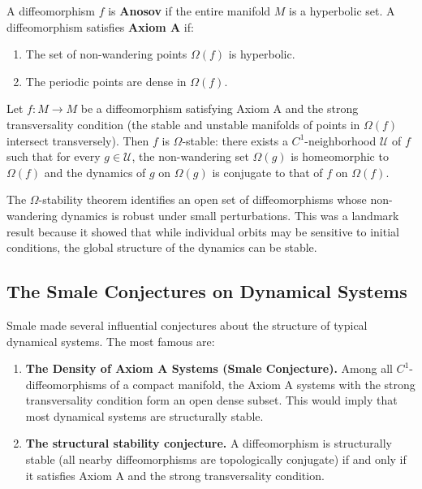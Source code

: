 A diffeomorphism \(f\) is \textbf{Anosov} if the entire manifold \(M\) is a hyperbolic set. A diffeomorphism satisfies \textbf{Axiom A} if:
\begin{enumerate}
    \item The set of non-wandering points \(\Omega(f)\) is hyperbolic.
    \item The periodic points are dense in \(\Omega(f)\).
\end{enumerate}

\begin{theorem}
Let \(f: M \to M\) be a diffeomorphism satisfying Axiom A and the strong transversality condition (the stable and unstable manifolds of points in \(\Omega(f)\) intersect transversely). Then \(f\) is \(\Omega\)-stable: there exists a \(C^1\)-neighborhood \(\mathcal{U}\) of \(f\) such that for every \(g \in \mathcal{U}\), the non-wandering set \(\Omega(g)\) is homeomorphic to \(\Omega(f)\) and the dynamics of \(g\) on \(\Omega(g)\) is conjugate to that of \(f\) on \(\Omega(f)\).
\end{theorem}

The \(\Omega\)-stability theorem identifies an open set of diffeomorphisms whose non-wandering dynamics is robust under small perturbations. This was a landmark result because it showed that while individual orbits may be sensitive to initial conditions, the global structure of the dynamics can be stable.

\subsection{The Smale Conjectures on Dynamical Systems}

Smale made several influential conjectures about the structure of typical dynamical systems. The most famous are:

\begin{enumerate}
    \item \textbf{The Density of Axiom A Systems (Smale Conjecture).} Among all \(C^1\)-diffeomorphisms of a compact manifold, the Axiom A systems with the strong transversality condition form an open dense subset. This would imply that most dynamical systems are structurally stable.
    \item \textbf{The structural stability conjecture.} A diffeomorphism is structurally stable (all nearby diffeomorphisms are topologically conjugate) if and only if it satisfies Axiom A and the strong transversality condition.
\end{enumerate}

